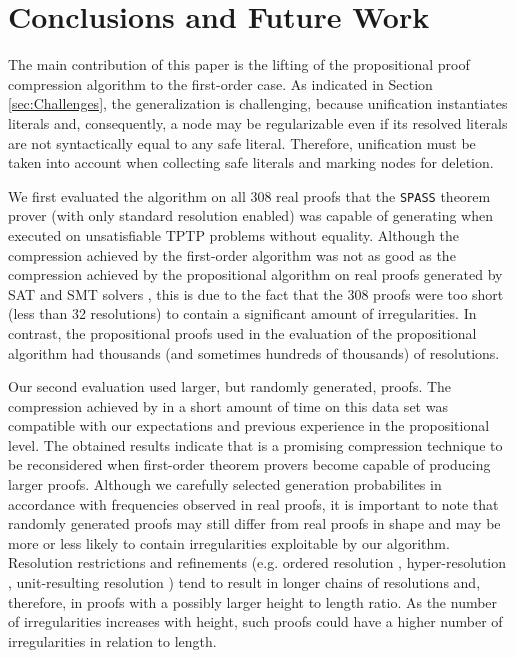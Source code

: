 \section{Conclusions and Future Work}\label{sec:conclusion}

The main contribution of this paper is the lifting of the propositional proof compression algorithm {\RPI} to the first-order case. As indicated in Section \ref{sec:Challenges}, the generalization is challenging, because unification instantiates literals and, consequently, a node may be regularizable even if its resolved literals are not syntactically equal to any safe literal. Therefore, unification must be taken into account when collecting safe literals and marking nodes for deletion.

We first evaluated the algorithm on all 308 real proofs that the \texttt{SPASS} theorem prover (with only standard resolution enabled) was capable of generating when executed on unsatisfiable TPTP problems without equality. Although the compression achieved by the first-order {\FORPI} algorithm was not as good as the compression achieved by the propositional {\RPI} algorithm on real proofs generated by SAT and SMT solvers \cite{LURPI}, this is due to the fact that the 308 proofs were too short (less than 32 resolutions) to contain a significant amount of irregularities. In contrast, the propositional proofs used in the evaluation of the propositional {\RPI} algorithm had thousands (and sometimes hundreds of thousands) of resolutions. 

Our second evaluation used larger, but randomly generated, proofs. The compression achieved by {\FORPI} in a short amount of time on this data set was compatible with our expectations and previous experience in the propositional level. The obtained results indicate that {\FORPI} is a promising compression technique to be reconsidered when first-order theorem provers become capable of producing larger proofs. Although we carefully selected generation probabilites in accordance with frequencies observed in real proofs, it is important to note that randomly generated proofs may still differ from real proofs in shape and may be more or less likely to contain irregularities exploitable by our algorithm. Resolution restrictions and refinements (e.g. ordered resolution %
\cite{hsiang1991proving, OrderedRes}, hyper-resolution \cite{HyperResolution,robinson1965automatic}, unit-resulting resolution \cite{UnitResultingResolution,prover9-mace4}) tend to result in longer chains of resolutions and, therefore, in proofs with a possibly larger height to length ratio. As the number of irregularities increases with height, such proofs could have a higher number of irregularities in relation to length.

